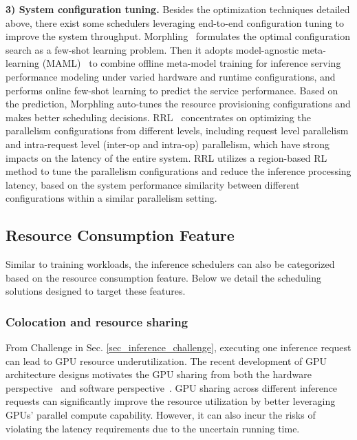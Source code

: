 \textbf{3) System configuration tuning. }
Besides the optimization techniques detailed above, there exist some schedulers leveraging end-to-end configuration tuning to improve the system throughput. Morphling~\cite{wang2021Morphling} formulates the optimal configuration search as a few-shot learning problem. Then it adopts model-agnostic meta-learning (MAML)~\cite{finn2017model} to combine offline meta-model training for inference serving performance modeling under varied hardware and runtime configurations, and performs online few-shot learning to predict the service performance. Based on the prediction, Morphling auto-tunes the resource provisioning configurations and makes better scheduling decisions.
RRL~\cite{qin2019swift} concentrates on optimizing the parallelism configurations from different levels, including request level parallelism and intra-request level (inter-op and intra-op) parallelism, which have strong impacts on the latency of the entire system. RRL utilizes a region-based RL method to tune the parallelism configurations and reduce the inference processing latency, based on the system performance similarity between different configurations within a similar parallelism setting.




\subsection{Resource Consumption Feature}
\label{sec_resource}
Similar to training workloads, the inference schedulers can also be categorized based on the resource consumption feature. Below we detail the scheduling solutions designed to target these features.


\subsubsection{Colocation and resource sharing}
\label{sec:inference_colocation}

From Challenge {\tiny{}} in Sec. \ref{sec_inference_challenge}, executing one inference request can lead to GPU resource underutilization. The recent development of GPU architecture designs motivates the GPU sharing from both the hardware perspective~\cite{mps,nvidia2020a100whitepaper} and software perspective~\cite{shi2012vCUDA,Salus}. GPU sharing across different inference requests can significantly improve the resource utilization by better leveraging GPUs' parallel compute capability. However, it can also incur the risks of violating the latency requirements due to the uncertain running time.

